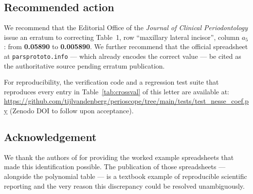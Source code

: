 \documentclass[11pt,a4paper]{article}
\begin{document}
\subsection*{Recommended action}

We recommend that the Editorial Office of the \emph{Journal of Clinical
Periodontology} issue an erratum to \citet{Nesse2008} correcting
Table~1, row ``maxillary lateral incisor'', column $a_5$:
from \textbf{0.05890} to \textbf{0.005890}. We further recommend that
the official spreadsheet at \texttt{parsprototo.info} --- which already
encodes the correct value --- be cited as the authoritative source
pending erratum publication.

For reproducibility, the verification code and a regression test suite
that reproduces every entry in Table~\ref{tab:crossval} of this letter
are available at:
\url{https://github.com/tijlvandenberg/perioscope/tree/main/tests/test_nesse_coef.py}
(Zenodo DOI to follow upon acceptance).

\subsection*{Acknowledgement}

We thank the authors of \citet{Nesse2008} for providing the worked
example spreadsheets that made this identification possible. The
publication of those spreadsheets --- alongside the polynomial table ---
is a textbook example of reproducible scientific reporting and the very
reason this discrepancy could be resolved unambiguously.



\end{document}
